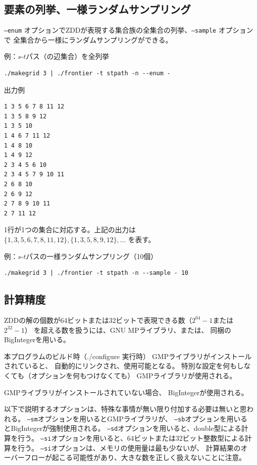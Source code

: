 \documentclass{jsarticle}
\begin{document}
\subsection{要素の列挙、一様ランダムサンプリング}

\texttt{--enum} オプションでZDDが表現する集合族の全集合の列挙、\texttt{--sample} オプションで
全集合から一様にランダムサンプリングができる。

例：$s$-$t$パス（の辺集合）を全列挙

\begin{verbatim}
./makegrid 3 | ./frontier -t stpath -n --enum -
\end{verbatim}

出力例

\begin{verbatim}
1 3 5 6 7 8 11 12
1 3 5 8 9 12
1 3 5 10
1 4 6 7 11 12
1 4 8 10
1 4 9 12
2 3 4 5 6 10
2 3 4 5 7 9 10 11
2 6 8 10
2 6 9 12
2 7 8 9 10 11
2 7 11 12
\end{verbatim}

1行が1つの集合に対応する。上記の出力は $\{1,3,5,6,7,8,11,12\},\{1,3,5,8,9,12\},\ldots$ を表す。

例：$s$-$t$パスの一様ランダムサンプリング（10個）

\begin{verbatim}
./makegrid 3 | ./frontier -t stpath -n --sample - 10
\end{verbatim}

\subsection{計算精度}\label{sec:precision}

ZDDの解の個数が64ビットまたは32ビットで表現できる数（$2^{64} - 1$または$2^{32} - 1$）
を超える数を扱うには、GNU MPライブラリ、または、
同梱のBigIntegerを用いる。

本プログラムのビルド時（./configure 実行時）
GMPライブラリがインストールされていると、
自動的にリンクされ、使用可能となる。
特別な設定を何もしなくても（オプションを何もつけなくても）
GMPライブラリが使用される。

GMPライブラリがインストールされていない場合、
BigIntegerが使用される。

以下で説明するオプションは、特殊な事情が無い限り付加する必要は無いと思われる。
\texttt{--sm}オプションを用いるとGMPライブラリが、
\texttt{--sb}オプションを用いるとBigIntegerが強制使用される。
\texttt{--sd}オプションを用いると、double型による計算を行う。
\texttt{--si}オプションを用いると、64ビットまたは32ビット整数型による計算を行う。
\texttt{--si}オプションは、メモリの使用量は最も少ないが、
計算結果のオーバーフローが起こる可能性があり、大きな数を正しく扱えないことに注意。
\end{document}
